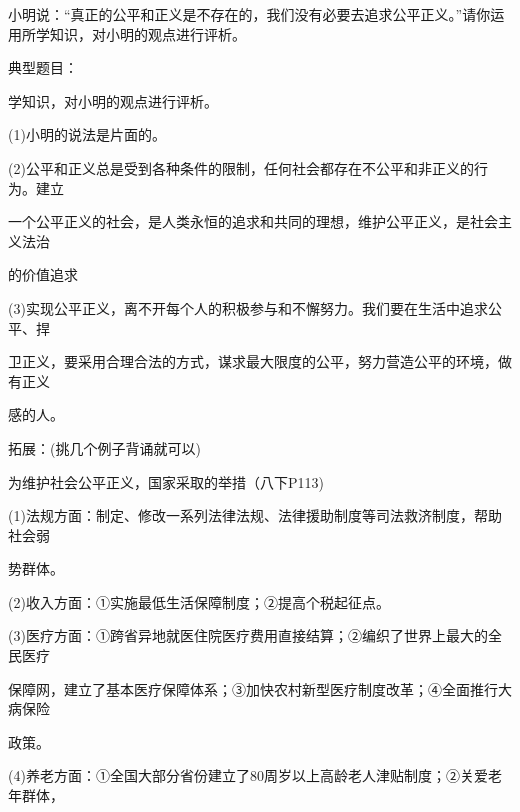 \documentclass[lang=cn,11pt]{elegantbook}
\newcommand{\daofasym}[1]{{\daofasymbolfont #1}}
\newcommand{\daofasym}[1]{#1}
\begin{document}
小明说：“真正的公平和正义是不存在的，我们没有必要去追求公平正义。”请你运用所学知识，对小明的观点进行评析。\par

典型题目：\par

学知识，对小明的观点进行评析。\par

(1)小明的说法是片面的。\par

(2)公平和正义总是受到各种条件的限制，任何社会都存在不公平和非正义的行为。建立\par

一个公平正义的社会，是人类永恒的追求和共同的理想，维护公平正义，是社会主义法治\par

的价值追求\par

(3)实现公平正义，离不开每个人的积极参与和不懈努力。我们要在生活中追求公平、捍\par

卫正义，要采用合理合法的方式，谋求最大限度的公平，努力营造公平的环境，做有正义\par

感的人。\par

拓展：(挑几个例子背诵就可以)\par

为维护社会公平正义，国家采取的举措（八下P113)\par

(1)法规方面：制定、修改一系列法律法规、法律援助制度等司法救济制度，帮助社会弱\par

势群体。\par

(2)收入方面：\daofasym{①}实施最低生活保障制度；\daofasym{②}提高个税起征点。\par

(3)医疗方面：\daofasym{①}跨省异地就医住院医疗费用直接结算；\daofasym{②}编织了世界上最大的全民医疗\par

保障网，建立了基本医疗保障体系；\daofasym{③}加快农村新型医疗制度改革；\daofasym{④}全面推行大病保险\par

政策。\par

(4)养老方面：\daofasym{①}全国大部分省份建立了80周岁以上高龄老人津贴制度；\daofasym{②}关爱老年群体，\par
\end{document}
